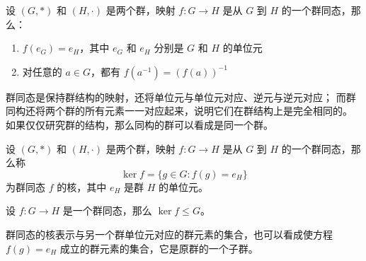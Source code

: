 \begin{proposition}[群同态的性质]
    设 $(G, *)$ 和 $(H, \cdot)$ 是两个群，映射 $f: G \to H$ 是从 $G$ 到 $H$ 的一个群同态，那么：
    \begin{enumerate}
        \item $f(e_G) = e_H$，其中 $e_G$ 和 $e_H$ 分别是 $G$ 和 $H$ 的单位元
        \item 对任意的 $a\in G$，都有 $f(a^{-1}) = (f(a))^{-1}$
    \end{enumerate}
\end{proposition}

\begin{note}
    群同态是保持群结构的映射，还将单位元与单位元对应、逆元与逆元对应；
    而群同构还将两个群的所有元素一一对应起来，说明它们在群结构上是完全相同的。
    如果仅仅研究群的结构，那么同构的群可以看成是同一个群。
\end{note}
\vspace{1em}

\begin{definition}
    设 $(G, *)$ 和 $(H, \cdot)$ 是两个群，映射 $f: G \to H$ 是从 $G$ 到 $H$ 的一个群同态，那么称
    \[
        \ker f = \{g\in G : f(g) = e_H\}
    \]
    为群同态 $f$ 的核，其中 $e_H$ 是群 $H$ 的单位元。
\end{definition}

\begin{proposition}
    设 $f:G\to H$ 是一个群同态，那么 $\ker f \le G$。
\end{proposition}

\begin{note}
    群同态的核表示与另一个群单位元对应的群元素的集合，也可以看成使方程 $f(g) = e_H$ 成立的群元素的集合，它是原群的一个子群。
\end{note}
\vspace{1em}

